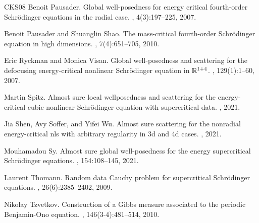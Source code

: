 \documentclass[10pt,leqno]{amsart}
\numberwithin{equation}{section}
\begin{document}
\begin{thebibliography}{CKS{\etalchar{+}}08}
Benoit Pausader.
\newblock Global well-posedness for energy critical fourth-order
  {S}chr\"{o}dinger equations in the radial case.
, 4(3):197--225, 2007.

Benoit Pausader and Shuanglin Shao.
\newblock The mass-critical fourth-order {S}chr\"{o}dinger equation in high
  dimensions.
, 7(4):651--705, 2010.

Eric Ryckman and Monica Visan.
\newblock Global well-posedness and scattering for the defocusing
  energy-critical nonlinear {S}chr\"{o}dinger equation in {$\Bbb R^{1+4}$}.
, 129(1):1--60, 2007.

Martin Spitz.
\newblock Almost sure local wellposedness and scattering for the
  energy-critical cubic nonlinear {S}chr\" odinger equation with supercritical
  data.
, 2021.

Jia Shen, Avy Soffer, and Yifei Wu.
\newblock Almost sure scattering for the nonradial energy-critical nls with
  arbitrary regularity in 3d and 4d cases.
, 2021.

Mouhamadou Sy.
\newblock Almost sure global well-posedness for the energy supercritical
  {S}chr\"{o}dinger equations.
, 154:108--145, 2021.

Laurent Thomann.
\newblock Random data {C}auchy problem for supercritical {S}chr\"{o}dinger
  equations.
,
  26(6):2385--2402, 2009.

Nikolay Tzvetkov.
\newblock Construction of a {G}ibbs measure associated to the periodic
  {B}enjamin-{O}no equation.
, 146(3-4):481--514, 2010.

\end{thebibliography}
\end{document}

